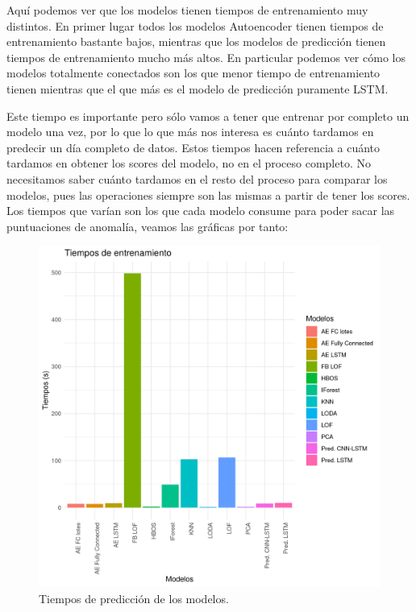 Aquí podemos ver que los modelos tienen tiempos de entrenamiento muy distintos. En primer lugar todos los modelos Autoencoder tienen tiempos de entrenamiento bastante bajos, mientras que los modelos de predicción tienen tiempos de entrenamiento mucho más altos. En particular podemos ver cómo los modelos totalmente conectados son los que menor tiempo de entrenamiento tienen mientras que el que más es el modelo de predicción puramente LSTM.

Este tiempo es importante pero sólo vamos a tener que entrenar por completo un modelo una vez, por lo que lo que más nos interesa es cuánto tardamos en predecir un día completo de datos. Estos tiempos hacen referencia a cuánto tardamos en obtener los scores del modelo, no en el proceso completo. No necesitamos saber cuánto tardamos en el resto del proceso para comparar los modelos, pues las operaciones siempre son las mismas a partir de tener los scores. Los tiempos que varían son los que cada modelo consume para poder sacar las puntuaciones de anomalía, veamos las gráficas por tanto:

\begin{figure}[H]
	\centering
	\includegraphics[scale=0.65]{imagenes/tiempos_prediccion.png}
	\caption{Tiempos de predicción de los modelos.}
	\label{img:tiempos-prediccion}
\end{figure}

